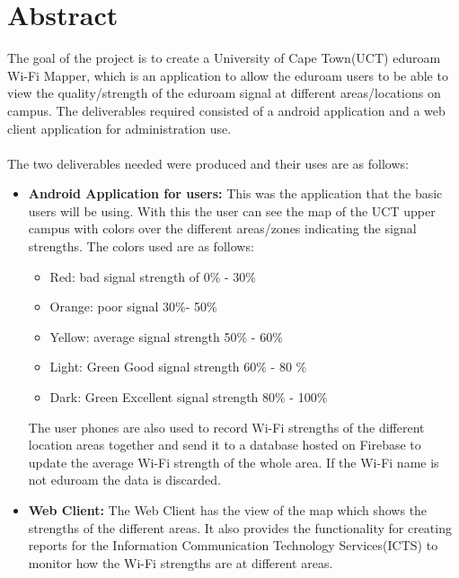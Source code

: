 \section*{Abstract}
The goal of the project is to create a University of Cape Town(UCT) eduroam Wi-Fi Mapper, which is an application to allow the  eduroam users to be able to view the quality/strength of the eduroam signal at different areas/locations on campus. The deliverables required consisted of a android application and a web client application for administration use.
\paragraph{}The two deliverables needed were produced and their uses are as follows:
\begin{itemize}
	\item \textbf{Android Application for users: }This was the application that the basic users will be using. With this the user can see the map of the UCT upper campus with colors over the different areas/zones indicating the signal strengths. The colors used are as follows:
	\begin{itemize}
		\item Red: bad signal strength of 0\% - 30\%
		\item Orange: poor signal 30\%- 50\%
		\item Yellow: average signal strength 50\% - 60\%
		\item Light: Green Good signal strength 60\% - 80 \%
		\item Dark:	 Green Excellent signal strength 80\% - 100\%
	\end{itemize}
	The user phones are also used to record Wi-Fi strengths of the different location areas together and send it to a database hosted on Firebase to update the average Wi-Fi strength of the whole area. If the Wi-Fi name is not eduroam the data is discarded.
	
	\item \textbf{Web Client: }The Web Client has the view of the map which shows the strengths of the different areas. It also provides the functionality for creating reports for the Information Communication Technology Services(ICTS) to monitor how the Wi-Fi strengths are at different areas.
\end{itemize}
